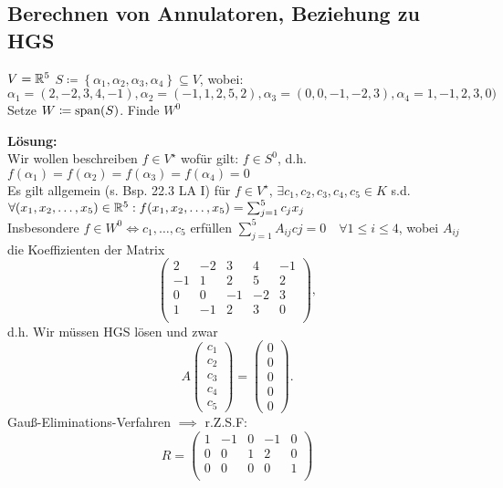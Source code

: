 \subsection{Berechnen von Annulatoren, Beziehung zu HGS}
\begin{subexample}
	$ V = \mathbb{R} ^5 $ $ S \coloneqq \left\{ \alpha_1, \alpha_2, \alpha_3, \alpha_4 \right\} \subseteq V $, wobei: $ \alpha_1 = (2, -2, 3, 4, -1), \alpha_2 = ( -1, 1, 2, 5, 2), \alpha_3 = (0, 0, -1, -2, 3), \alpha_4 = 1, -1, 2, 3, 0) $\\
	Setze $ W \coloneqq \operatorname{span}(S) $. Finde $ W^0 $ 

	\textbf{Lösung:}\\
	Wir wollen beschreiben $ f \in V^\star $ wofür gilt: $ f \in S^0 $, d.h. $ f(\alpha_1) = f(\alpha_2) = f(\alpha_3) = f(\alpha_4) = 0 $\\
	Es gilt allgemein (s. Bsp. 22.3 LA I) für $ f \in V^\star $, $ \exists c_1, c_2, c_3, c_4, c_5 \in K $ s.d. $ \forall (x_1, x_2, \dotsc, x_5) \in \mathbb{R} ^5 :  f(x_1, x_2, \dotsc, x_5) = \sum_{j=1}^{5} c_j x_j $\\
	Insbesondere $ f \in W^0 \iff c_1, \dotsc, c_5 $ erfüllen $ \sum_{j=1}^{5} A_{ij} cj = 0 \quad \forall 1 \leq i \leq 4 $, wobei $ A_{ij}  $ die Koeffizienten der Matrix
	\[
		\begin{pmatrix} 
			2 & -2 & 3 & 4 & -1 \\
			-1 & 1 & 2 & 5 & 2 \\
			0 & 0 & -1 & -2 & 3 \\
			1 & -1 & 2 & 3 & 0 \\
		\end{pmatrix} ,
	\]
	d.h. Wir müssen HGS lösen und zwar
	\[
		A \begin{pmatrix} c_1\\c_2\\c_3\\c_4\\c_5 \end{pmatrix} = \begin{pmatrix} 0\\0\\0\\0\\0 \end{pmatrix} .
	\]
	Gauß-Eliminations-Verfahren $ \implies  $ r.Z.S.F:
	\[
		R = \begin{pmatrix} 
			1 & -1 & 0 & -1 & 0 \\
			0 & 0 & 1 & 2 & 0 \\
			0 & 0 & 0 & 0 & 1 \\

\end{pmatrix}\]
\end{subexample}
